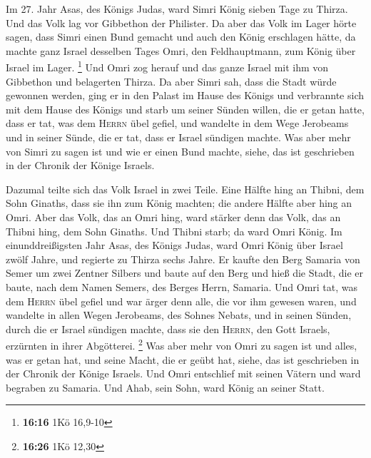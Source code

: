  Im 27. Jahr Asas, des Königs Judas, ward Simri König
sieben Tage zu Thirza. Und das Volk lag vor Gibbethon der Philister.
 Da aber das Volk im Lager hörte sagen, dass Simri einen
Bund gemacht und auch den König erschlagen hätte, da machte ganz Israel
desselben Tages Omri, den Feldhauptmann, zum König über Israel im Lager.
\footnote{\textbf{16:16} 1Kö 16,9-10}  Und Omri zog
herauf und das ganze Israel mit ihm von Gibbethon und belagerten Thirza.
 Da aber Simri sah, dass die Stadt würde gewonnen werden,
ging er in den Palast im Hause des Königs und verbrannte sich mit dem
Hause des Königs und starb  um seiner Sünden willen, die
er getan hatte, dass er tat, was dem \textsc{Herrn} übel gefiel, und
wandelte in dem Wege Jerobeams und in seiner Sünde, die er tat, dass er
Israel sündigen machte.  Was aber mehr von Simri zu sagen
ist und wie er einen Bund machte, siehe, das ist geschrieben in der
Chronik der Könige Israels.

 Dazumal teilte sich das Volk Israel in zwei Teile. Eine
Hälfte hing an Thibni, dem Sohn Ginaths, dass sie ihn zum König machten;
die andere Hälfte aber hing an Omri.  Aber das Volk, das
an Omri hing, ward stärker denn das Volk, das an Thibni hing, dem Sohn
Ginaths. Und Thibni starb; da ward Omri König.  Im
einunddreißigsten Jahr Asas, des Königs Judas, ward Omri König über
Israel zwölf Jahre, und regierte zu Thirza sechs Jahre. 
Er kaufte den Berg Samaria von Semer um zwei Zentner Silbers und baute
auf den Berg und hieß die Stadt, die er baute, nach dem Namen Semers,
des Berges Herrn, Samaria.  Und Omri tat, was dem
\textsc{Herrn} übel gefiel und war ärger denn alle, die vor ihm gewesen
waren,  und wandelte in allen Wegen Jerobeams, des Sohnes
Nebats, und in seinen Sünden, durch die er Israel sündigen machte, dass
sie den \textsc{Herrn}, den Gott Israels, erzürnten in ihrer Abgötterei.
\footnote{\textbf{16:26} 1Kö 12,30}  Was aber mehr von
Omri zu sagen ist und alles, was er getan hat, und seine Macht, die er
geübt hat, siehe, das ist geschrieben in der Chronik der Könige Israels.
 Und Omri entschlief mit seinen Vätern und ward begraben
zu Samaria. Und Ahab, sein Sohn, ward König an seiner Statt.

